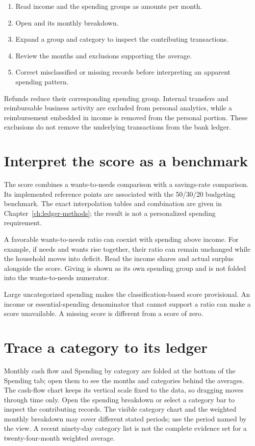 \begin{enumerate}
\item Read income and the spending groups as amounts per month.
\item Open  and its monthly breakdown.
\item Expand a group and category to inspect the contributing transactions.
\item Review the months and exclusions supporting the average.
\item Correct misclassified or missing records before interpreting an apparent spending pattern.
\end{enumerate}

Refunds reduce their corresponding spending group. Internal transfers and reimbursable business activity are excluded from personal analytics, while a reimbursement embedded in income is removed from the personal portion. These exclusions do not remove the underlying transactions from the bank ledger.

\section{Interpret the score as a benchmark}
The score combines a wants-to-needs comparison with a savings-rate comparison. Its implemented reference points are associated with the 50/30/20 budgeting benchmark. The exact interpolation tables and combination are given in Chapter~\ref{ch:ledger-methods}; the result is not a personalized spending requirement.

A favorable wants-to-needs ratio can coexist with spending above income. For example, if needs and wants rise together, their ratio can remain unchanged while the household moves into deficit. Read the income shares and actual surplus alongside the score. Giving is shown as its own spending group and is not folded into the wants-to-needs numerator.

Large uncategorized spending makes the classification-based score provisional. An income or essential-spending denominator that cannot support a ratio can make a score unavailable. A missing score is different from a score of zero.

\section{Trace a category to its ledger}
Monthly cash flow and Spending by category are folded at the bottom of the Spending tab; open them to see the months and categories behind the averages. The cash-flow chart keeps its vertical scale fixed to the data, so dragging moves through time only. Open the spending breakdown or select a category bar to inspect the contributing records. The visible category chart and the weighted monthly breakdown may cover different stated periods; use the period named by the view. A recent ninety-day category list is not the complete evidence set for a twenty-four-month weighted average.

